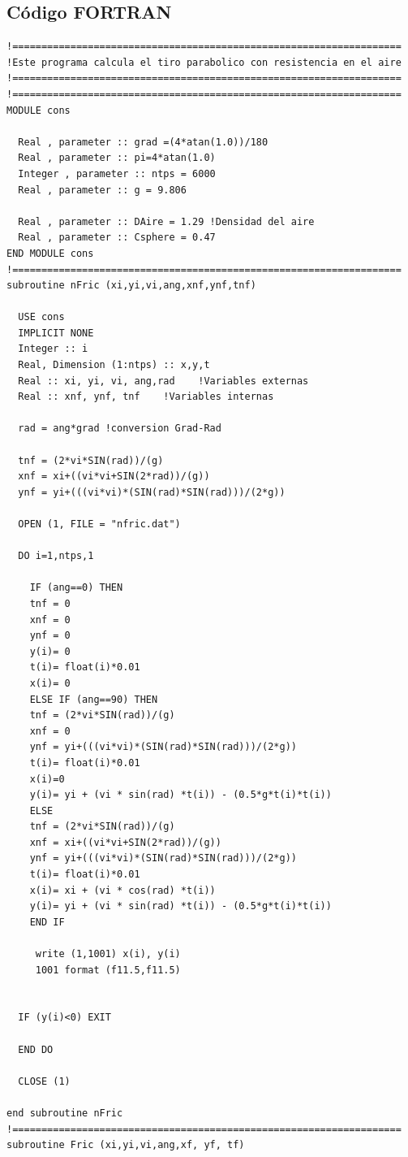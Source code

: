 \documentclass[12pt]{article}
\begin{document}
\subsection{Código FORTRAN}
\begin{verbatim}
!===================================================================
!Este programa calcula el tiro parabolico con resistencia en el aire
!===================================================================
!===================================================================
MODULE cons

  Real , parameter :: grad =(4*atan(1.0))/180
  Real , parameter :: pi=4*atan(1.0)
  Integer , parameter :: ntps = 6000
  Real , parameter :: g = 9.806

  Real , parameter :: DAire = 1.29 !Densidad del aire
  Real , parameter :: Csphere = 0.47
END MODULE cons
!===================================================================
subroutine nFric (xi,yi,vi,ang,xnf,ynf,tnf)
 
  USE cons
  IMPLICIT NONE
  Integer :: i 
  Real, Dimension (1:ntps) :: x,y,t
  Real :: xi, yi, vi, ang,rad    !Variables externas
  Real :: xnf, ynf, tnf    !Variables internas

  rad = ang*grad !conversion Grad-Rad

  tnf = (2*vi*SIN(rad))/(g)
  xnf = xi+((vi*vi+SIN(2*rad))/(g))
  ynf = yi+(((vi*vi)*(SIN(rad)*SIN(rad)))/(2*g))

  OPEN (1, FILE = "nfric.dat")

  DO i=1,ntps,1

    IF (ang==0) THEN
	tnf = 0
	xnf = 0
	ynf = 0
	y(i)= 0
	t(i)= float(i)*0.01	
	x(i)= 0
    ELSE IF (ang==90) THEN
	tnf = (2*vi*SIN(rad))/(g)
	xnf = 0
	ynf = yi+(((vi*vi)*(SIN(rad)*SIN(rad)))/(2*g))		
	t(i)= float(i)*0.01
	x(i)=0
	y(i)= yi + (vi * sin(rad) *t(i)) - (0.5*g*t(i)*t(i))
    ELSE 
	tnf = (2*vi*SIN(rad))/(g)
	xnf = xi+((vi*vi+SIN(2*rad))/(g))
	ynf = yi+(((vi*vi)*(SIN(rad)*SIN(rad)))/(2*g))	
	t(i)= float(i)*0.01
	x(i)= xi + (vi * cos(rad) *t(i))
	y(i)= yi + (vi * sin(rad) *t(i)) - (0.5*g*t(i)*t(i))
    END IF     
     
     write (1,1001) x(i), y(i)
     1001 format (f11.5,f11.5)
 

  IF (y(i)<0) EXIT
     
  END DO

  CLOSE (1)
  
end subroutine nFric
!===================================================================
subroutine Fric (xi,yi,vi,ang,xf, yf, tf)
	

\end{verbatim}
\end{document}
